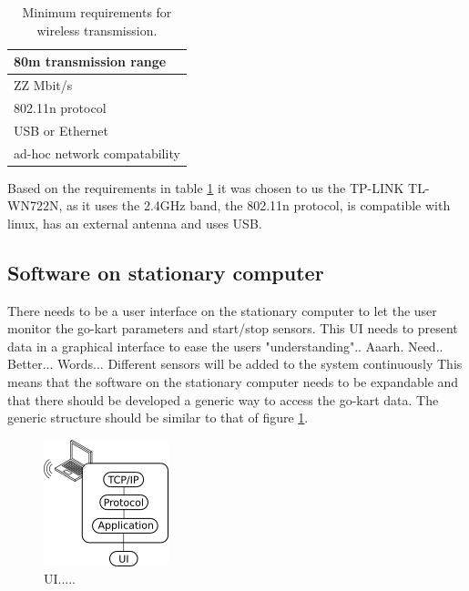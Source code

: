 \begin{table}[]
\centering
\caption{Minimum requirements for wireless transmission.}
\label{tab:req_wifi}
\begin{tabular}{|l|}
\hline
80m transmission range       \\ \hline
ZZ Mbit/s                    \\ \hline
802.11n protocol             \\ \hline
USB or Ethernet              \\ \hline
ad-hoc network compatability \\ \hline
\end{tabular}
\end{table}
Based on the requirements in table \ref{tab:req_wifi} it was chosen to us the TP-LINK TL-WN722N, as it uses the 2.4GHz band, the 802.11n protocol, is compatible with linux, has an external antenna and uses USB. 






















\subsection{Software on stationary computer}
There needs to be a user interface on the stationary computer to let the user monitor the go-kart parameters and start/stop sensors. 
This UI needs to present data in a graphical interface to ease the users "understanding".. Aaarh. Need.. Better... Words... 
Different sensors will be added to the system continuously  
This means that the software on the stationary computer needs to be expandable and that there should be developed a generic way to access the go-kart data.
The generic structure should be similar to that of figure \ref{fig:setup_ui}.


\begin{figure}[h]
	\centering
	\includegraphics{graphics/UI}
	\caption{UI.....}
	\label{fig:setup_ui}
\end{figure}

